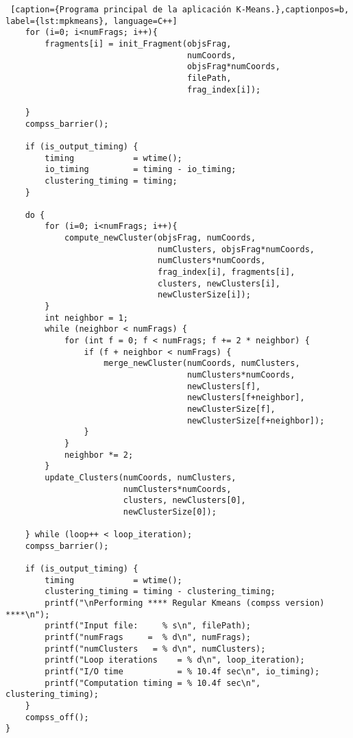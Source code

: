 \begin{lstlisting} [caption={Programa principal de la aplicación K-Means.},captionpos=b, 
label={lst:mpkmeans}, language=C++]
    for (i=0; i<numFrags; i++){
        fragments[i] = init_Fragment(objsFrag, 
									 numCoords,
									 objsFrag*numCoords,
									 filePath,
									 frag_index[i]);

    }
    compss_barrier();

    if (is_output_timing) {
        timing            = wtime();
        io_timing         = timing - io_timing;
        clustering_timing = timing;
    }

    do {
        for (i=0; i<numFrags; i++){
	    	compute_newCluster(objsFrag, numCoords, 
							   numClusters, objsFrag*numCoords,
							   numClusters*numCoords,
							   frag_index[i], fragments[i],
							   clusters, newClusters[i],
							   newClusterSize[i]);
        }
        int neighbor = 1;
        while (neighbor < numFrags) {
            for (int f = 0; f < numFrags; f += 2 * neighbor) {
                if (f + neighbor < numFrags) {
        			merge_newCluster(numCoords, numClusters, 
									 numClusters*numCoords, 
									 newClusters[f], 
									 newClusters[f+neighbor],
									 newClusterSize[f], 
									 newClusterSize[f+neighbor]);
                }
            }
            neighbor *= 2;
        }
        update_Clusters(numCoords, numClusters, 
						numClusters*numCoords,
						clusters, newClusters[0],
						newClusterSize[0]);

    } while (loop++ < loop_iteration);
    compss_barrier();

    if (is_output_timing) {
        timing            = wtime();
        clustering_timing = timing - clustering_timing;
        printf("\nPerforming **** Regular Kmeans (compss version) ****\n");
        printf("Input file:     % s\n", filePath);
        printf("numFrags     =  % d\n", numFrags);
        printf("numClusters   = % d\n", numClusters);
        printf("Loop iterations    = % d\n", loop_iteration);
        printf("I/O time           = % 10.4f sec\n", io_timing);
        printf("Computation timing = % 10.4f sec\n", clustering_timing);
    }
    compss_off();
}
\end{lstlisting}

